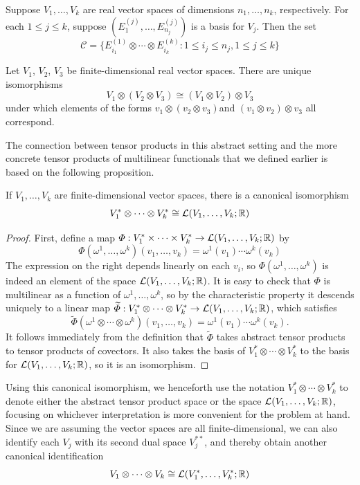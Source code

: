 \begin{proposition}\label{tensor prod basis}
Suppose $V_1,\dots,V_k$ are real vector spaces of dimensions $n_1,\dots,n_k$, respectively. For each $1\leq j\leq k$, suppose $(E_1^{(j)},\dots,E_{n_j}^{(j)})$ is a basis for $V_j$. Then the set
\[\mathcal{C}=\{E_{i_1}^{(1)}\otimes\cdots\otimes E_{i_k}^{(k)}:1\leq i_j\leq n_j,1\leq j\leq k\}\]
\end{proposition}
\begin{proposition}
Let $V_1$, $V_2$, $V_3$ be finite-dimensional real vector spaces. There are unique isomorphisms
\[V_1\otimes(V_2\otimes V_3)\cong(V_1\otimes V_2)\otimes V_3\]
under which elements of the forms $v_1\otimes(v_2\otimes v_3)$and $(v_1\otimes v_2)\otimes v_3$ all correspond.
\end{proposition}
The connection between tensor products in this abstract setting and the more
concrete tensor products of multilinear functionals that we defined earlier is based on the following proposition.
\begin{proposition}
If $V_1,\dots,V_k$ are finite-dimensional vector spaces, there is a canonical isomorphism
\[V_1^*\otimes\cdots\otimes V_k^*\cong\mathcal{L}(V_1,\dots,V_k;\mathbb{R})\]
\end{proposition}
\begin{proof}
First, define a map $\varPhi:V_1^*\times\cdots\times V_k^*\to\mathcal{L}(V_1,\dots,V_k;\mathbb{R})$ by
\[\varPhi(\omega^1,\dots,\omega^k)(v_1,\dots,v_k)=\omega^1(v_1)\cdots\omega^k(v_k)\]
The expression on the right depends linearly on each $v_i$, so $\varPhi(\omega^1,\dots,\omega^k)$ is indeed an element of the space $\mathcal{L}(V_1,\dots,V_k;\mathbb{R})$. It is easy to check that $\varPhi$ is multilinear as a function of $\omega^1,\dots,\omega^k$, so by the characteristic property it descends uniquely to a linear map $\widetilde{\varPhi}:V_1^*\otimes\cdots\otimes V_k^*\to\mathcal{L}(V_1,\dots,V_k;\mathbb{R})$, which satisfies
\[\widetilde{\varPhi}(\omega^1\otimes\cdots\otimes\omega^k)(v_1,\dots,v_k)=\omega^1(v_1)\cdots\omega^k(v_k).\]
It follows immediately from the definition that $\widetilde{\varPhi}$ takes abstract tensor products to tensor products of covectors. It also takes the basis of $V_1^*\otimes\cdots\otimes V_k^*$ to the basis for $\mathcal{L}(V_1,\dots,V_k;\mathbb{R})$, so it is an isomorphism.
\end{proof}
Using this canonical isomorphism, we henceforth use the notation $V_1^*\otimes\cdots\otimes V_k^*$ to denote either the abstract tensor product space or the space $\mathcal{L}(V_1,\dots,V_k;\mathbb{R})$, focusing on whichever interpretation is more convenient for the problem at hand. Since we are assuming the vector spaces are all finite-dimensional, we can also identify each $V_j$ with its second dual space $V^{**}_j$, and thereby obtain another canonical identification
\[V_1\otimes\cdots\otimes V_k\cong\mathcal{L}(V_1^*,\dots,V_k^*;\mathbb{R})\]
